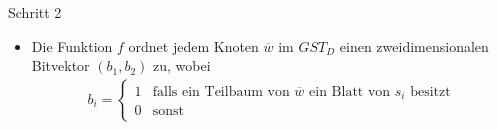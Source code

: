 \documentclass{beamer}
\begin{document}
\begin{frame}
\begin{example}
\begin{figure}
\end{figure}
\end{example}
\vspace{-5mm}
\begin{block}{Schritt 2}
\begin{itemize}
    \item Die Funktion $f$ ordnet jedem Knoten $\overline{w}$ im $GST_D$ einen zweidimensionalen Bitvektor $(b_1, b_2)$ zu, wobei
    \begin{gather*}
        b_i = \begin{cases}
            1 &\text{falls ein Teilbaum von } \overline{w} \text{ ein Blatt von } s_i \text{ besitzt} \\
            0 &\text{sonst}
        \end{cases}
    \end{gather*}
\end{itemize}
\end{block}
\end{frame}
\end{document}

